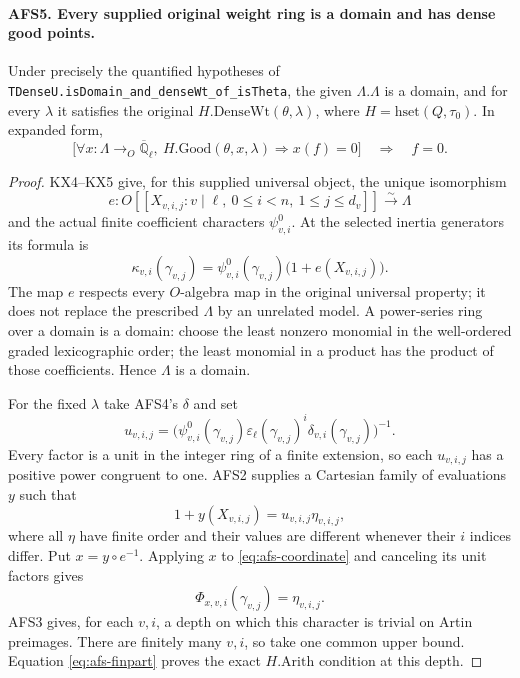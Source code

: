 \paragraph{AFS5. Every supplied original weight ring is a domain and has dense good points.}
\label{claim:AFS5}
Under precisely the quantified hypotheses of
\texttt{TDenseU.isDomain\_and\_denseWt\_of\_isTheta}, the given
$\Lambda.\Lambda$ is a domain, and for every $\lambda$ it
satisfies the original $H.\mathrm{DenseWt}(\theta,\lambda)$,
where $H=\mathrm{hset}(Q,\tau_0)$.  In expanded form,
\[
 \bigl[\forall x:\Lambda\to_O\overline{\mathbb Q}_\ell,
       \ H.\mathrm{Good}(\theta,x,\lambda)\Rightarrow x(f)=0\bigr]
                    \quad\Longrightarrow\quad f=0.
\]
\begin{proof}
KX4--KX5 give, for this supplied universal object, the unique
isomorphism
\[
 e:O[[X_{v,i,j}:v\mid\ell,\ 0\leq i<n,\ 1\leq j\leq d_v]]
                         \overset\sim\longrightarrow\Lambda
\]
and the actual finite coefficient characters $\psi^0_{v,i}$.
At the selected inertia generators its formula is
\begin{equation}\label{eq:afs-coordinate}
 \kappa_{v,i}(\gamma_{v,j})
       =\psi^0_{v,i}(\gamma_{v,j})\bigl(1+e(X_{v,i,j})\bigr).
\end{equation}
The map $e$ respects every $O$-algebra map in the original
universal property; it does not replace the prescribed $\Lambda$
by an unrelated model.  A power-series ring over a domain is a
domain: choose the least nonzero monomial in the well-ordered
graded lexicographic order; the least monomial in a product has
the product of those coefficients.  Hence $\Lambda$ is a domain.

For the fixed $\lambda$ take AFS4's $\delta$ and set
\[
 u_{v,i,j}=
 \bigl(\psi^0_{v,i}(\gamma_{v,j})
       \varepsilon_\ell(\gamma_{v,j})^i
       \delta_{v,i}(\gamma_{v,j})\bigr)^{-1}.
\]
Every factor is a unit in the integer ring of a finite extension,
so each $u_{v,i,j}$ has a positive power congruent to one.
AFS2 supplies a Cartesian family of evaluations $y$ such that
\[
 1+y(X_{v,i,j})=u_{v,i,j}\eta_{v,i,j},
\]
where all $\eta$ have finite order and their values are
different whenever their $i$ indices differ.  Put
$x=y\circ e^{-1}$.  Applying $x$ to
\eqref{eq:afs-coordinate} and canceling its unit factors gives
\begin{equation}\label{eq:afs-torsionvalues}
             \Phi_{x,v,i}(\gamma_{v,j})=\eta_{v,i,j}.
\end{equation}
AFS3 gives, for each $v,i$, a depth on which this character
is trivial on Artin preimages.  There are finitely many
$v,i$, so take one common upper bound.  Equation
\eqref{eq:afs-finpart} proves the exact $H.\mathrm{Arith}$
condition at this depth.


\end{proof}
